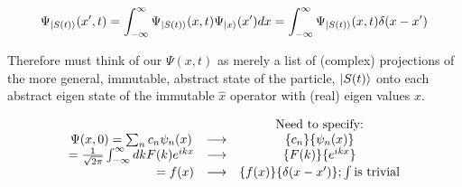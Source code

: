 \documentclass{article}
\begin{document}
$$\Psi_{\ket{S(t)}} (x',t) = \int_{- \infty}^\infty \Psi_{\ket{S(t)}} (x,t) \Psi_{\ket{x}} (x') dx = \int_{- \infty}^\infty \Psi_{\ket{S(t)}} (x,t) \delta(x - x')$$

Therefore must think of our $\Psi(x,t)$ as merely a list of (complex) projections of the more general, immutable, abstract state of the particle, $\ket{S(t)}$ onto each abstract eigen state of the immutable $\hat{x}$  operator with (real) eigen values $x$.


$$\begin{matrix}
& & \text{Need to specify:} \\
\Psi(x,0) = \sum_n c_n \psi_n(x) & \longrightarrow &  \{c_n\} \{ \psi_n(x)\} \\
\hfill
= \frac{1}{\sqrt{2 \pi}} \int_{- \infty}^\infty dk F(k) e^{ikx} & \longrightarrow & \{F(k)\} \{e^{ikx}\} \\
\hfill
= f(x) & \longrightarrow & \{f(x)\} \{\delta(x-x')\}; \int \text{is trivial}
\end{matrix}$$
\end{document}
